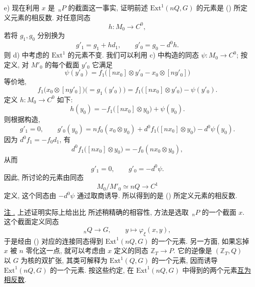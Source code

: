 \medskip
\noindent e) 现在利用 $x$ 是 $\,{}_nP$ 的截面这一事实, 证明前述 $\mathrm{Ext}^1(nQ,G)$ 的元素是 () 所定义元素的相反数. 对任意同态
\[
 h:M_0\longrightarrow C^0,
\]
若将 $g_1,g_0$ 分别换为
\[
 g'_1=g_1+h d_1,
 \qquad
 g'_0=g_0-d^0h.
\]
则 d) 中考虑的 $\mathrm{Ext}^1$ 的元素不变. 我们可以利用 c) 中构造的同态 $\psi:M_0\longrightarrow C^0$; 按定义, 对 $M'_0$ 的每个截面 $y'_0$ 它满足
\[
 \psi(y'_0)=
 f_1\bigl([nx_0]\otimes y'_0-x_0\otimes[ny'_0]\bigr)
\]
等价地,
\[
 f_1\bigl(x_0\otimes[ny'_0]\bigr)
 \bigl(=g_1(y'_0)\bigr)
 =f_1\bigl([nx_0]\otimes y'_0\bigr)-\psi(y'_0).
\]
定义 $h:M_0\longrightarrow C^0$ 如下:
\[
 h(y_0)=-f_1\bigl([nx_0]\otimes y_0\bigr)+\psi(y_0).
\]
则根据构造,
\[
 g'_1=0,
 \qquad
 g'_0(y_0)=n f_0(x_0\otimes y_0)
 +d^0f_1\bigl([nx_0]\otimes y_0\bigr)-d^0\psi(y_0).
\]
因为 $d^0f_1=-f_0d_1$, 有
\[
 d^0f_1\bigl([nx_0]\otimes y_0\bigr)
 =-f_0(nx_0\otimes y_0),
\]
从而
\[
 g'_1=0,
 \qquad
 g'_0=-d^0\psi.
\]
因此, 所讨论的元素由同态
\[
 M_0/M'_0\simeq nQ\longrightarrow C^1
\]
定义, 这个同态由 $-d^0\psi$ 通过取商诱导. 所以得到的是 () 所定义元素的相反数.

\medskip
\noindent\underline{注 .} 上述证明实际上给出比  所述稍精确的相容性, 方法是选取 $\,{}_nP$ 的一个截面 $x$. 这个截面定义同态
\[
 {}_nQ\longrightarrow G,
 \qquad
 y\longmapsto\varphi_\xi(x,y),
\]
于是经由 () 对应的连接同态得到 $\mathrm{Ext}^1(nQ,G)$ 的一个元素. 另一方面, 如果忘掉 $x$ 被 $n$ 零化这一点, 就可以考虑由 $x$ 定义的同态 $\mathbb Z_T\longrightarrow P$. 它的逆像是 $(\mathbb Z_T,Q)$ 以 $G$ 为核的双扩张, 其类可解释为 $\mathrm{Ext}^1(Q,G)$ 的一个元素, 因而诱导 $\mathrm{Ext}^1(nQ,G)$ 的一个元素. 按这些约定, 在 $\mathrm{Ext}^1(nQ,G)$ 中得到的两个元素\underline{互为相反数}.



